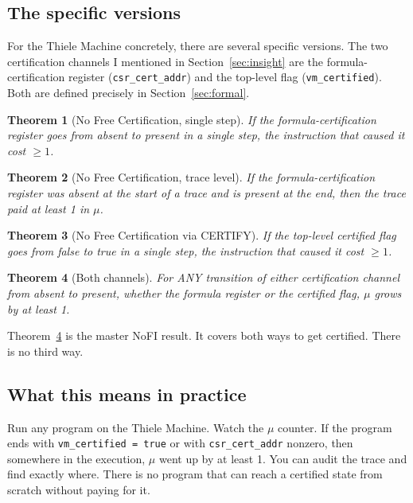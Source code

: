 \documentclass[11pt,a4paper]{article}
\theoremstyle{plain}
\newtheorem{theorem}{Theorem}[section]
\theoremstyle{definition}
\theoremstyle{remark}
\begin{document}
\subsection{The specific versions}

For the Thiele Machine concretely, there are several specific versions. The two certification channels I mentioned in Section~\ref{sec:insight} are the formula-certification register (\texttt{csr\_cert\_addr}) and the top-level flag (\texttt{vm\_certified}). Both are defined precisely in Section~\ref{sec:formal}.

\begin{theorem}[No Free Certification, single step]
If the formula-certification register goes from absent to present in a single step, the instruction that caused it cost $\geq 1$.
\end{theorem}

\begin{theorem}[No Free Certification, trace level]
If the formula-certification register was absent at the start of a trace and is present at the end, then the trace paid at least 1 in $\mu$.
\end{theorem}

\begin{theorem}[No Free Certification via CERTIFY]
If the top-level certified flag goes from false to true in a single step, the instruction that caused it cost $\geq 1$.
\end{theorem}

\begin{theorem}[Both channels]
\label{thm:allchannels}
For ANY transition of either certification channel from absent to present, whether the formula register or the certified flag, $\mu$ grows by at least 1.
\end{theorem}

Theorem~\ref{thm:allchannels} is the master NoFI result. It covers both ways to get certified. There is no third way.

\subsection{What this means in practice}

Run any program on the Thiele Machine. Watch the $\mu$ counter. If the program ends with \texttt{vm\_certified = true} or with \texttt{csr\_cert\_addr} nonzero, then somewhere in the execution, $\mu$ went up by at least 1. You can audit the trace and find exactly where. There is no program that can reach a certified state from scratch without paying for it.
\end{document}
